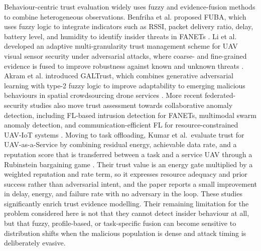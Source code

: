 \documentclass[notspecified,article,submit,moreauthors]{Definitions/mdpi}
\begin{document}
Behaviour-centric trust evaluation widely uses fuzzy and evidence-fusion methods to combine heterogeneous observations. Benfriha et al. proposed FUBA, which uses fuzzy logic to integrate indicators such as RSSI, packet delivery ratio, delay, battery level, and humidity to identify insider threats in FANETs \cite{benfriha2024fuba}. Li et al. developed an adaptive multi-granularity trust management scheme for UAV visual sensor security under adversarial attacks, where coarse- and fine-grained evidence is fused to improve robustness against known and unknown threats \cite{li2025multigranularity}. Akram et al. introduced GALTrust, which combines generative adversarial learning with type-2 fuzzy logic to improve adaptability to emerging malicious behaviours in spatial crowdsourcing drone services \cite{akram2024galtrust}. More recent federated-security studies also move trust assessment towards collaborative anomaly detection, including FL-based intrusion detection for FANETs, multimodal swarm anomaly detection, and communication-efficient FL for resource-constrained UAV-IoT systems \cite{ceviz2025flids,lu2024swarmfl,gad2024somkd}. Moving to task offloading, Kumar et al.\ evaluate trust for UAV-as-a-Service by combining residual energy, achievable data rate, and a reputation score that is transferred between a task and a service UAV through a Rubinstein bargaining game \cite{kumar2025tofu}. Their trust value is an energy gate multiplied by a weighted reputation and rate term, so it expresses resource adequacy and prior success rather than adversarial intent, and the paper reports a small improvement in delay, energy, and failure rate with no adversary in the loop. These studies significantly enrich trust evidence modelling. Their remaining limitation for the problem considered here is not that they cannot detect insider behaviour at all, but that fuzzy, profile-based, or task-specific fusion can become sensitive to distribution shifts when the malicious population is dense and attack timing is deliberately evasive.
\end{document}
